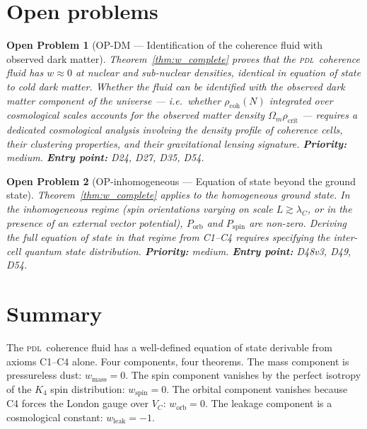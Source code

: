 \documentclass[12pt,a4paper]{article}
\newtheorem{openproblem}{Open Problem}
\newcommand{\Kfour}{K_4}
\newcommand{\PDL}{\textsc{pdl}}
\newcommand{\rhocoh}{\rho_{\mathrm{coh}}}
\newcommand{\VC}{V_C}
\newcommand{\lambdaC}{\lambda_C}
\begin{document}
\section{Open problems}
\label{sec:open}

\begin{openproblem}[OP-DM --- Identification of the coherence fluid with observed dark matter]
\label{op:DM}
Theorem~\ref{thm:w_complete} proves that the \PDL\ coherence fluid has $w \approx 0$ at nuclear and sub-nuclear densities, identical in equation of state to cold dark matter. Whether the fluid can be identified with the observed dark matter component of the universe --- i.e.\ whether $\rhocoh(N)$ integrated over cosmological scales accounts for the observed matter density $\Omega_m\rho_{\mathrm{crit}}$ --- requires a dedicated cosmological analysis involving the density profile of coherence cells, their clustering properties, and their gravitational lensing signature. \textbf{Priority:} medium. \textbf{Entry point:} D24, D27, D35, D54.
\end{openproblem}

\begin{openproblem}[OP-inhomogeneous --- Equation of state beyond the ground state]
\label{op:inhomogeneous}
Theorem~\ref{thm:w_complete} applies to the homogeneous ground state. In the inhomogeneous regime (spin orientations varying on scale $L \gtrsim \lambdaC$, or in the presence of an external vector potential), $P_{\mathrm{orb}}$ and $P_{\mathrm{spin}}$ are non-zero. Deriving the full equation of state in that regime from C1--C4 requires specifying the inter-cell quantum state distribution. \textbf{Priority:} medium. \textbf{Entry point:} D48v3, D49, D54.
\end{openproblem}

\section{Summary}
\label{sec:summary}

The \PDL\ coherence fluid has a well-defined equation of state derivable from axioms C1--C4 alone. Four components, four theorems. The mass component is pressureless dust: $w_{\mathrm{mass}} = 0$. The spin component vanishes by the perfect isotropy of the $\Kfour$ spin distribution: $w_{\mathrm{spin}} = 0$. The orbital component vanishes because C4 forces the London gauge over $\VC$: $w_{\mathrm{orb}} = 0$. The leakage component is a cosmological constant: $w_{\mathrm{leak}} = -1$.
\end{document}
